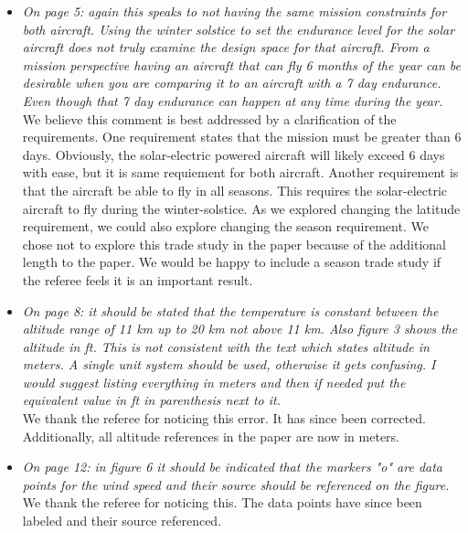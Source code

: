 \documentclass[10pt, a4paper]{article}
\begin{document}
\begin{itemize}
    \item \emph{On page 5: again this speaks to not having the same mission constraints for both aircraft. Using the winter solstice to set the endurance level for the solar aircraft does not truly examine the design space for that aircraft. From a mission perspective having an aircraft that can fly 6 months of the year can be desirable when you are comparing it to an aircraft with a 7 day endurance. Even though that 7 day endurance can happen at any time during the year.} \\

        We believe this comment is best addressed by a clarification of the requirements.  One requirement states that the mission must be greater than 6 days.  Obviously, the solar-electric powered aircraft will likely exceed 6 days with ease, but it is same requiement for both aircraft.  Another requirement is that the aircraft be able to fly in all seasons.  This requires the solar-electric aircraft to fly during the winter-solstice.  As we explored changing the latitude requirement, we could also explore changing the season requirement.  We chose not to explore this trade study in the paper because of the additional length to the paper.  We would be happy to include a season trade study if the referee feels it is an important result. 

    \item \emph{On page 8: it should be stated that the temperature is constant between the altitude range of 11 km up to 20 km not above 11 km. Also figure 3 shows the altitude in ft. This is not consistent with the text which states altitude in meters. A single unit system should be used, otherwise it gets confusing. I would suggest listing everything in meters and then if needed put the equivalent value in ft in parenthesis next to it.} \\

        We thank the referee for noticing this error.  It has since been corrected.  Additionally, all altitude references in the paper are now in meters.

    \item \emph{On page 12: in figure 6 it should be indicated that the markers "o" are data points for the wind speed and their source should be referenced on the figure.} \\

        We thank the referee for noticing this.  The data points have since been labeled and their source referenced. 


\end{itemize}
\end{document}
